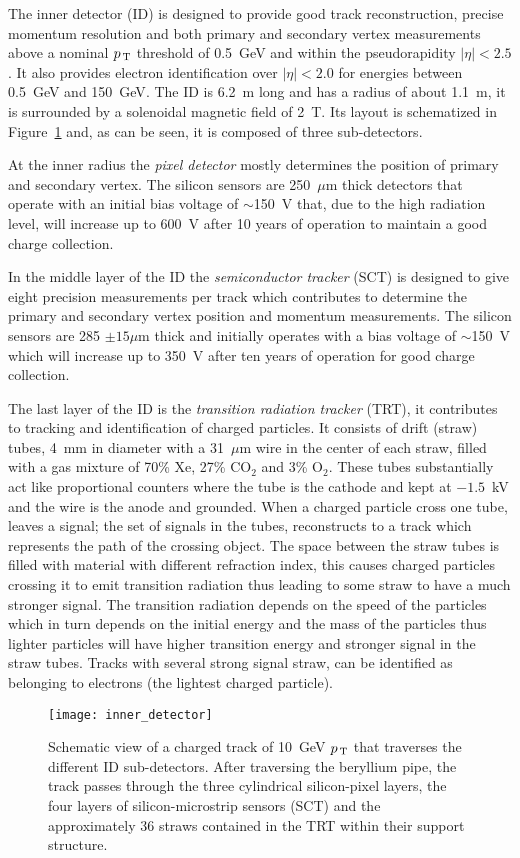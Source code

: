 The inner detector (ID) is designed to provide good track reconstruction,
precise momentum resolution and both primary and secondary vertex measurements
above a nominal $p_\mathrm{\, T}$ threshold of 0.5~GeV and within the pseudorapidity
$|\eta| < 2.5$. It also provides electron identification over $|\eta| < 2.0$ for
energies between 0.5~GeV and 150~GeV\cite{ATLASPaper}. The ID is 6.2~m long and
has a radius of about 1.1~m, it is surrounded by a solenoidal magnetic field of
2~T. Its layout is schematized in Figure~\ref{fig:id} and, as can be seen, it is
composed of three sub-detectors.

At the inner radius the \emph{pixel detector} mostly determines the position of
primary and secondary vertex. The silicon sensors are 250~$\mu$m thick detectors
that operate with an initial bias voltage of $\sim$150~V that, due to the high
radiation level, will increase up to 600~V after 10 years of operation to
maintain a good charge collection.

In the middle layer of the ID the \emph{semiconductor tracker} (SCT) is designed
to give eight precision measurements per track which contributes to determine
the primary and secondary vertex position and momentum measurements. The silicon
sensors are 285 $\pm 15 \mu$m thick and initially operates with a bias voltage
of $\sim$150~V which will increase up to 350~V after ten years of operation for
good charge collection.

The last layer of the ID is the \emph{transition radiation tracker} (TRT), it
contributes to tracking and identification of charged particles. It consists of
drift (straw) tubes, 4~mm in diameter with a 31~$\mu$m wire in the center of
each straw, filled with a gas mixture of 70\% Xe, 27\% CO$_2$ and 3\%
O$_2$. These tubes substantially act like proportional counters where the tube
is the cathode and kept at $- 1.5$~kV and the wire is the anode and
grounded. When a charged particle cross one tube, leaves a signal; the set of
signals in the tubes, reconstructs to a track which represents the path of the
crossing object. The space between the straw tubes is filled with material with
different refraction index, this causes charged particles crossing it to emit
transition radiation thus leading to some straw to have a much stronger
signal. The transition radiation depends on the speed of the particles which in
turn depends on the initial energy and the mass of the particles thus lighter
particles will have higher transition energy and stronger signal in the straw
tubes. Tracks with several strong signal straw, can be identified as belonging
to electrons (the lightest charged particle).

\begin{figure}[!h]
  \centering
    \texttt{[image: inner\_detector]}
    \caption{Schematic view of a charged track of 10~GeV $p_\mathrm{\, T}$ that traverses
      the different ID sub-detectors. After traversing the beryllium pipe, the
      track passes through the three cylindrical silicon-pixel layers, the four
      layers of silicon-microstrip sensors (SCT) and the approximately 36 straws
      contained in the TRT within their support structure.}
    \label{fig:id}
\end{figure}
